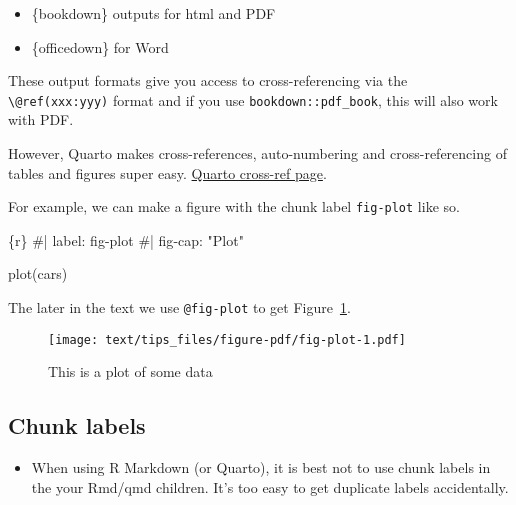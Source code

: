 \documentclass[
  letterpaper,
  oneside]{scrbook}
\newenvironment{Shaded}{\begin{snugshade}}{\end{snugshade}}
\newcommand{\NormalTok}[1]{\textcolor[rgb]{0.00,0.23,0.31}{#1}}
\providecommand{\tightlist}{%
  \setlength{\itemsep}{0pt}\setlength{\parskip}{0pt}}\usepackage{longtable,booktabs,array}
\begin{document}
\begin{itemize}
\tightlist
\item
  \{bookdown\} outputs for html and PDF
\item
  \{officedown\} for Word
\end{itemize}

These output formats give you access to cross-referencing via the
\texttt{\textbackslash{}@ref(xxx:yyy)} format and if you use
\texttt{bookdown::pdf\_book}, this will also work with PDF.

However, Quarto makes cross-references, auto-numbering and
cross-referencing of tables and figures super easy.
\href{https://quarto.org/docs/authoring/cross-references.html}{Quarto
cross-ref page}.

For example, we can make a figure with the chunk label \texttt{fig-plot}
like so.

\begin{Shaded}
\begin{Highlighting}[]
\NormalTok{\textasciigrave{}\textasciigrave{}\textasciigrave{}\{r\}}
\NormalTok{\#| label: fig{-}plot}
\NormalTok{\#| fig{-}cap: "Plot"}

\NormalTok{plot(cars)}
\NormalTok{\textasciigrave{}\textasciigrave{}\textasciigrave{}}
\end{Highlighting}
\end{Shaded}

The later in the text we use \texttt{@fig-plot} to get
Figure~\ref{fig-plot}.

\begin{figure}

{\centering \texttt{[image: text/tips\_files/figure-pdf/fig-plot-1.pdf]}

}

\caption{\label{fig-plot}This is a plot of some data}

\end{figure}

\hypertarget{chunk-labels}{%
\subsection{Chunk labels}\label{chunk-labels}}

\begin{itemize}
\tightlist
\item
  When using R Markdown (or Quarto), it is best not to use chunk labels
  in the your Rmd/qmd children. It's too easy to get duplicate labels
  accidentally.
\end{itemize}
\end{document}
